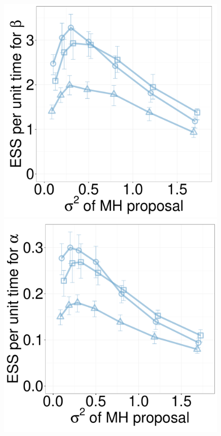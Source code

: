 \begin{figure}[H]
\begin{minipage}[hp]{0.24\linewidth}
    \includegraphics [width=0.99\textwidth, angle=0]{figs/new_whole_exp_figs/mh_cq_beta_dim3.pdf}
	\end{minipage}
  \begin{minipage}[hp]{0.24\linewidth}
  \centering
    \includegraphics [width=0.99\textwidth, angle=0]{figs/new_whole_exp_figs/mh_cq_alpha_dim10.pdf}

\end{minipage}
\end{figure}
